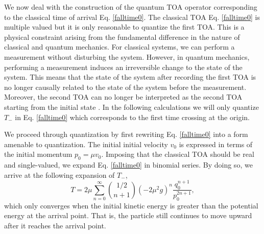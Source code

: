 \documentclass[%
 reprint,
 amsmath,amssymb,
 aps,
]{revtex4-1}
\begin{document}
We now deal with the construction of the quantum TOA operator corresponding to the classical time of arrival Eq. \eqref{falltime0}. The classical TOA Eq. \eqref{falltime0} is multiple valued but it is only reasonable to quantize the first TOA. This is a physical constraint arising from the fundamental difference in the nature of classical and quantum mechanics. For classical systems, we can perform a measurement without disturbing the system. However, in quantum mechanics, performing a measurement induces an irreversible change to the state of the system. This means that the state of the system after recording the first TOA is no longer causally related to the state of the system before the measurement. Moreover, the second TOA can no longer be interpreted as the second TOA starting from the initial state \cite{jaykel}. In the following calculations we will only quantize $T_{-}$ in Eq. \eqref{falltime0} which corresponds to the first time crossing at the origin.

We proceed through quantization by first rewriting Eq. \eqref{falltime0} into a form amenable to quantization. The initial initial velocity $v_0$ is expressed in terms of the initial momentum $p_0=\mu v_0$. Imposing that the classical TOA should be real and single-valued, we expand Eq. \eqref{falltime0} in binomial series. By doing so, we arrive at the following expansion of $T_-$, 
\begin{equation}
T= 2 \mu \sum_{n=0}^{\infty} \binom{1/2}{n+1} (-2 \mu^2 g)^n \frac{q_0^{n+1}}{p_0^{2n+1}} \label{eqltoa},
\end{equation}
which only converges when the initial kinetic energy is greater than the potential energy at the arrival point. That is, the particle still continues to move upward after it reaches the arrival point. 
\end{document}
